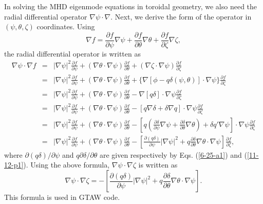 \documentclass{llncs}
\begin{document}
In solving the MHD eigenmode equations in toroidal geometry, we also need the
radial differential operator $\nabla \psi \cdot \nabla$. Next, we derive the
form of the operator in $(\psi, \theta, \zeta)$ coordinates. Using
\[ \nabla f = \frac{\partial f}{\partial \psi} \nabla \psi + \frac{\partial
   f}{\partial \theta} \nabla \theta + \frac{\partial f}{\partial \zeta}
   \nabla \zeta, \]
the radial differential operator is written as
\begin{eqnarray}
  \nabla \psi \cdot \nabla f & = & | \nabla \psi |^2 \frac{\partial
  f}{\partial \psi} + (\nabla \theta \cdot \nabla \psi) \frac{\partial
  f}{\partial \theta} + (\nabla \zeta \cdot \nabla \psi) \frac{\partial
  f}{\partial \zeta} \nonumber\\
  & = & | \nabla \psi |^2 \frac{\partial f}{\partial \psi} + (\nabla \theta
  \cdot \nabla \psi) \frac{\partial f}{\partial \theta} + \{ \nabla [\phi - q
  \delta (\psi, \theta)] \cdot \nabla \psi \} \frac{\partial f}{\partial
  \zeta} \nonumber\\
  & = & | \nabla \psi |^2 \frac{\partial f}{\partial \psi} + (\nabla \theta
  \cdot \nabla \psi) \frac{\partial f}{\partial \theta} - \nabla [q \delta]
  \cdot \nabla \psi \frac{\partial f}{\partial \zeta} \nonumber\\
  & = & | \nabla \psi |^2 \frac{\partial f}{\partial \psi} + (\nabla \theta
  \cdot \nabla \psi) \frac{\partial f}{\partial \theta} - [q \nabla \delta +
  \delta \nabla q] \cdot \nabla \psi \frac{\partial f}{\partial \zeta}
  \nonumber\\
  & = & | \nabla \psi |^2 \frac{\partial f}{\partial \psi} + (\nabla \theta
  \cdot \nabla \psi) \frac{\partial f}{\partial \theta} - \left[ q \left(
  \frac{\partial \delta}{\partial \psi} \nabla \psi + \frac{\partial
  \delta}{\partial \theta} \nabla \theta \right) + \delta q' \nabla \psi
  \right] \cdot \nabla \psi \frac{\partial f}{\partial \zeta} \nonumber\\
  & = & | \nabla \psi |^2 \frac{\partial f}{\partial \psi} + (\nabla \theta
  \cdot \nabla \psi) \frac{\partial f}{\partial \theta} - \left[
  \frac{\partial (q \delta)}{\partial \psi} | \nabla \psi |^2 + q
  \frac{\partial \delta}{\partial \theta} \nabla \theta \cdot \nabla \psi
  \right] \frac{\partial f}{\partial \zeta},  \label{5-13-2}
\end{eqnarray}
where $\partial (q \delta) / \partial \psi$ and $q \partial \delta / \partial
\theta$ are given respectively by Eqs. (\ref{6-25-a1}) and (\ref{11-12-p1}).
Using the above formula, $\nabla \psi \cdot \nabla \zeta$ is written as
\begin{equation}
  \nabla \psi \cdot \nabla \zeta = - \left[ \frac{\partial (q
  \delta)}{\partial \psi} | \nabla \psi |^2 + q \frac{\partial
  \delta}{\partial \theta} \nabla \theta \cdot \nabla \psi \right] .
\end{equation}
This formula is used in GTAW code.
\end{document}
